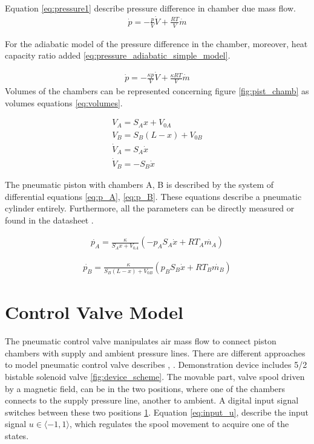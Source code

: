 Equation \ref{eq:pressure1} describe pressure difference in chamber due
mass flow.
\begin{align}
    \dot{p} = - \frac{p}{V}\dot{V} + \frac{RT}{V}\dot{m}
    \label{eq:pressure1}
\end{align}


For the adiabatic model of the pressure difference in the chamber,
moreover, heat capacity ratio added
\ref{eq:pressure_adiabatic_simple_model}.

\begin{align}
    \dot{p} = - \frac{\kappa p}{V}\dot{V} + \frac{\kappa RT}{V}\dot{m}
    \label{eq:pressure_adiabatic_simple_model}
\end{align}
Volumes of the chambers can be represented concerning figure
\ref{fig:pist_chamb} as volumes equations \ref{eq:volumes}.

\begin{align}
    V_A = S_A x + V_{0A} \\
    V_B = S_B (L-x) + V_{0B} \\
    \dot{V}_A = S_A \dot{x} \\
    \dot{V}_B = - S_B \dot{x}
    \label{eq:volumes}
\end{align}

The pneumatic piston with chambers A, B is described by the system of
differential equations \ref{eq:p_A}, \ref{eq:p_B}. These equations describe a pneumatic
cylinder entirely. Furthermore, all the parameters can be directly measured
or found in the datasheet \cite{}.

\begin{align}
    \dot{p_A} = \frac{\kappa}{S_A x + V_{0A}} \left(- p_A S_A\dot{x} +
    RT_A\dot{m_A} \right)
    \label{eq:p_A}
\end{align}

\begin{align}
    \dot{p_B} = \frac{\kappa}{S_B (L-x) + V_{0B}} \left(p_B S_B\dot{x} +
    RT_B\dot{m_B} \right)
    \label{eq:p_B}
\end{align}


\section{Control Valve Model}
The pneumatic control valve manipulates air mass flow to connect piston
chambers with supply and ambient pressure lines. There are different
approaches to model pneumatic control valve describes \cite{}, \cite{}.
Demonstration device includes 5/2 bistable solenoid valve
\ref{fig:device_scheme}. The movable part, valve spool driven by a magnetic
field, can be in the two positions, where one of the chambers connects to
the supply pressure line, another to ambient. A digital input signal
switches between these two positions \ref{}.  Equation \ref{eq:input_u},
describe the input signal $u \in \langle-1,1\rangle$, which regulates the
spool movement to acquire one of
the states. 

